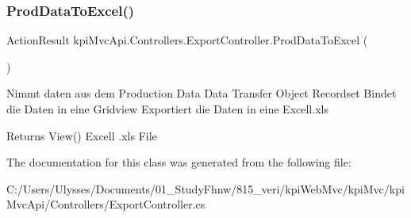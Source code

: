 \subsubsection{\texorpdfstring{Prod\+Data\+To\+Excel()}{ProdDataToExcel()}}
{\footnotesize\ttfamily Action\+Result kpi\+Mvc\+Api.\+Controllers.\+Export\+Controller.\+Prod\+Data\+To\+Excel (\begin{DoxyParamCaption}{ }\end{DoxyParamCaption})\hspace{0.3cm}{\ttfamily [inline]}}



Nimmt daten aus dem Production Data Data Transfer Object Recordset Bindet die Daten in eine Gridview Exportiert die Daten in eine Excell.\+xls 

\begin{DoxyReturn}{Returns}
View() Excell .xls File 
\end{DoxyReturn}


The documentation for this class was generated from the following file\+:\begin{DoxyCompactItemize}
\item 
C\+:/\+Users/\+Ulysses/\+Documents/01\+\_\+\+Study\+Fhnw/815\+\_\+veri/kpi\+Web\+Mvc/kpi\+Mvc/kpi\+Mvc\+Api/\+Controllers/Export\+Controller.\+cs\end{DoxyCompactItemize}
